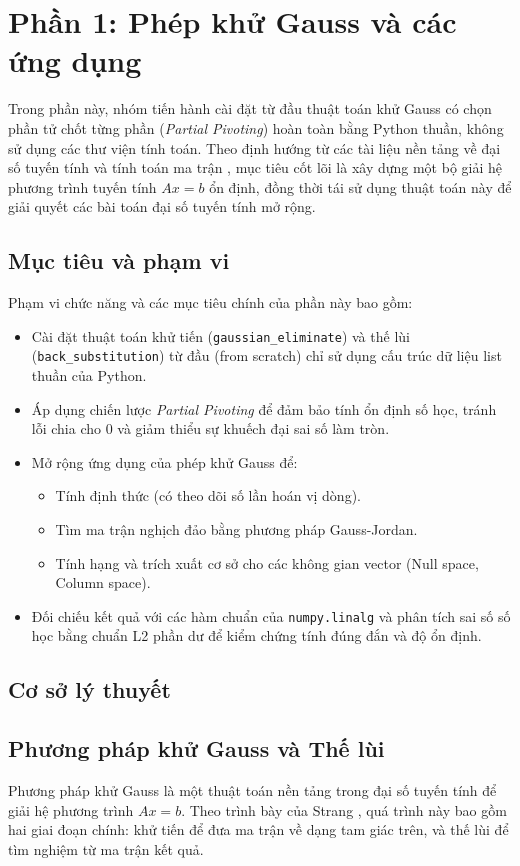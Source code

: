 \section{Phần 1: Phép khử Gauss và các ứng dụng}
Trong phần này, nhóm tiến hành cài đặt từ đầu thuật toán khử Gauss có chọn phần tử chốt từng phần (\textit{Partial Pivoting}) hoàn toàn bằng Python thuần, không sử dụng các thư viện tính toán. Theo định hướng từ các tài liệu nền tảng về đại số tuyến tính và tính toán ma trận \cite{strang,golub}, mục tiêu cốt lõi là xây dựng một bộ giải hệ phương trình tuyến tính $Ax=b$ ổn định, đồng thời tái sử dụng thuật toán này để giải quyết các bài toán đại số tuyến tính mở rộng.

\subsection{Mục tiêu và phạm vi}
Phạm vi chức năng và các mục tiêu chính của phần này bao gồm:
\begin{itemize}
    \item Cài đặt thuật toán khử tiến (\texttt{gaussian\_eliminate}) và thế lùi (\texttt{back\_substitution}) từ đầu (from scratch) chỉ sử dụng cấu trúc dữ liệu list thuần của Python.
    \item Áp dụng chiến lược \textit{Partial Pivoting} để đảm bảo tính ổn định số học, tránh lỗi chia cho 0 và giảm thiểu sự khuếch đại sai số làm tròn.
    \item Mở rộng ứng dụng của phép khử Gauss để: 
    \begin{itemize}
        \item Tính định thức (có theo dõi số lần hoán vị dòng).
        \item Tìm ma trận nghịch đảo bằng phương pháp Gauss-Jordan.
        \item Tính hạng và trích xuất cơ sở cho các không gian vector (Null space, Column space).
    \end{itemize}
    \item Đối chiếu kết quả với các hàm chuẩn của \texttt{numpy.linalg} và phân tích sai số số học bằng chuẩn L2 phần dư để kiểm chứng tính đúng đắn và độ ổn định.
\end{itemize}

\subsection{Cơ sở lý thuyết}

\subsection{Phương pháp khử Gauss và Thế lùi}
Phương pháp khử Gauss là một thuật toán nền tảng trong đại số tuyến tính để giải hệ phương trình $Ax=b$. Theo trình bày của Strang \cite{strang}, quá trình này bao gồm hai giai đoạn chính: khử tiến để đưa ma trận về dạng tam giác trên, và thế lùi để tìm nghiệm từ ma trận kết quả.

